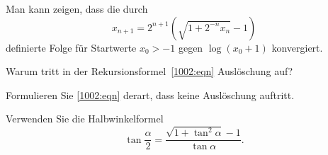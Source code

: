 Man kann zeigen, dass die durch
\begin{equation}
x_{n+1} = 2^{n+1} (\sqrt{1+2^{-n}x_n}-1)
\label{1002:eqn}
\end{equation}
definierte Folge für Startwerte $x_0>-1$ gegen $\log(x_0+1)$ konvergiert.
%
\begin{teilaufgaben}
\item
Warum tritt in der Rekursionsformel~\eqref{1002:eqn} Auslöschung auf?
%
\item
Formulieren Sie \eqref{1002:eqn} derart, dass keine Auslöschung auftritt.
%
\end{teilaufgaben}

\begin{hinweis}
Verwenden Sie die Halbwinkelformel
%
\begin{equation}
\tan\frac{\alpha}2 = \frac{\sqrt{1+\tan^2 \alpha } - 1}{\tan \alpha}.
\label{buch:1002:halbwinkel}
\end{equation}
\end{hinweis}

